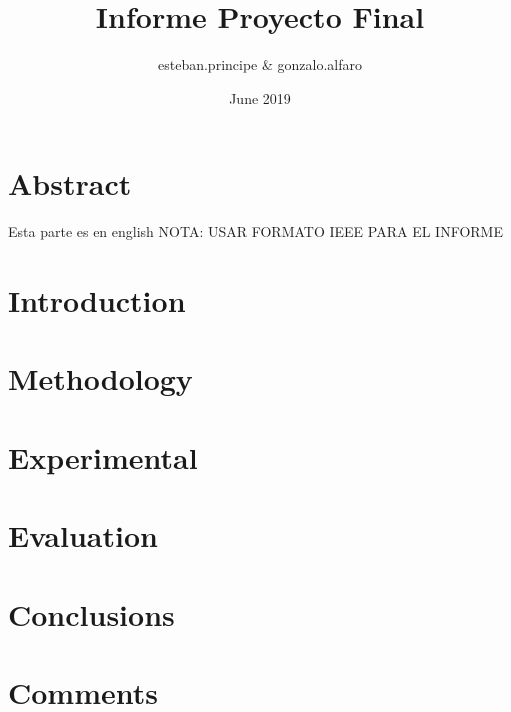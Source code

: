 \documentclass{article}
\title{Informe Proyecto Final}
\author{esteban.principe & gonzalo.alfaro}
\date{June 2019}
\begin{document}
\maketitle

\section{Abstract}
Esta parte es en english 
NOTA: USAR FORMATO IEEE PARA EL INFORME 
\section{Introduction}
\section{Methodology}
\section{Experimental}
\section{Evaluation}
\section{Conclusions}
\section{Comments}



\end{document}

